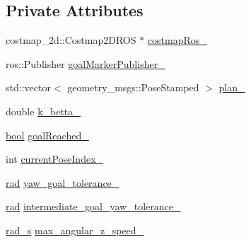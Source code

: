 \subsection*{Private Attributes}
\begin{DoxyCompactItemize}
\item 
costmap\+\_\+2d\+::\+Costmap2\+D\+R\+OS $\ast$ \hyperlink{classcl__move__base__z_1_1pure__spinning__local__planner_1_1PureSpinningLocalPlanner_a63f75481071df118d56e8b652e68b002}{costmap\+Ros\+\_\+}
\item 
ros\+::\+Publisher \hyperlink{classcl__move__base__z_1_1pure__spinning__local__planner_1_1PureSpinningLocalPlanner_a84d46237a0a26822fe5675f0cdddc94d}{goal\+Marker\+Publisher\+\_\+}
\item 
std\+::vector$<$ geometry\+\_\+msgs\+::\+Pose\+Stamped $>$ \hyperlink{classcl__move__base__z_1_1pure__spinning__local__planner_1_1PureSpinningLocalPlanner_a31875ee78bae4698b579e20c0754860d}{plan\+\_\+}
\item 
double \hyperlink{classcl__move__base__z_1_1pure__spinning__local__planner_1_1PureSpinningLocalPlanner_a379d2ba057231d76edd1a661d3572d68}{k\+\_\+betta\+\_\+}
\item 
\hyperlink{classbool}{bool} \hyperlink{classcl__move__base__z_1_1pure__spinning__local__planner_1_1PureSpinningLocalPlanner_aecfe0dfc68b8c8e461e8b684e5fa4d2f}{goal\+Reached\+\_\+}
\item 
int \hyperlink{classcl__move__base__z_1_1pure__spinning__local__planner_1_1PureSpinningLocalPlanner_aa0f9b4cf52a76e44dc2cfc5103d52dcd}{current\+Pose\+Index\+\_\+}
\item 
\hyperlink{backward__local__planner_8h_a640effbe91ae9b25d698a883a9e80d96}{rad} \hyperlink{classcl__move__base__z_1_1pure__spinning__local__planner_1_1PureSpinningLocalPlanner_a07334cd7bf29f391c2553f0038fa94e8}{yaw\+\_\+goal\+\_\+tolerance\+\_\+}
\item 
\hyperlink{backward__local__planner_8h_a640effbe91ae9b25d698a883a9e80d96}{rad} \hyperlink{classcl__move__base__z_1_1pure__spinning__local__planner_1_1PureSpinningLocalPlanner_a2e8dfda5e9dea6f09db4056aa90b2aa8}{intermediate\+\_\+goal\+\_\+yaw\+\_\+tolerance\+\_\+}
\item 
\hyperlink{pure__spinning__local__planner_8h_a76bf9d2bc75b779e3418b2320c652037}{rad\+\_\+s} \hyperlink{classcl__move__base__z_1_1pure__spinning__local__planner_1_1PureSpinningLocalPlanner_a20edb2db356925684de4ee4fe03d5992}{max\+\_\+angular\+\_\+z\+\_\+speed\+\_\+}
\end{DoxyCompactItemize}


